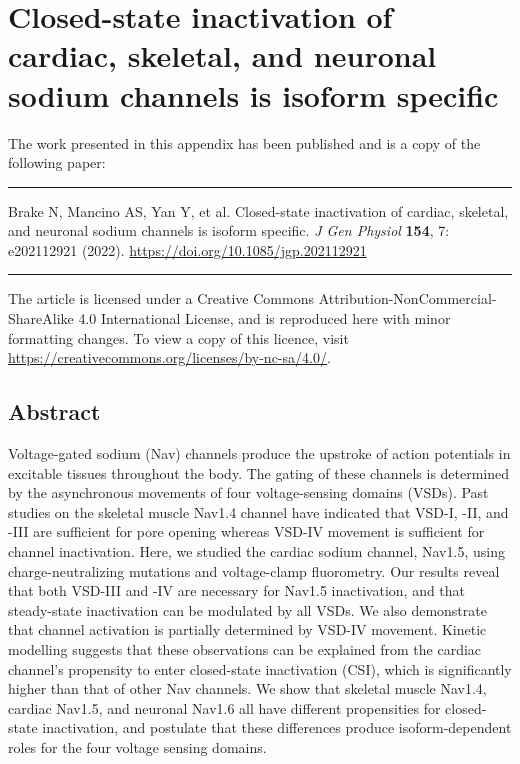 \chapter{Closed-state inactivation of cardiac, skeletal, and neuronal sodium channels is isoform specific}
\label{sec:Nav}


\hypersetup{citecolor=black,linkcolor=black}

\normalsize
\renewcommand{\thefigure}{A.\arabic{figure}}
\renewcommand{\figurename}{Fig.}
\setcounter{figure}{0}
\captionsetup{list=false}

The work presented in this appendix has been published and is a copy of the following paper:

\vspace{1em}
\hrule
\vspace{.5em}
\noindent
\hangindent=1cm
Brake N, Mancino AS, Yan Y, et al. Closed-state inactivation of cardiac, skeletal, and neuronal sodium channels is isoform specific. \textit{J Gen Physiol} \textbf{154}, 7: e202112921 (2022). \url{https://doi.org/10.1085/jgp.202112921}
\vspace{.75em}
\hrule
\vspace{.65em}

\noindent
The article is licensed under a Creative Commons Attribution-NonCommercial-ShareAlike 4.0 International License, and is reproduced here with minor formatting changes. To view a copy of this licence, visit \url{https://creativecommons.org/licenses/by-nc-sa/4.0/}.


\section{Abstract}
Voltage-gated sodium (Nav) channels produce the upstroke of action potentials in excitable tissues throughout the body. The gating of these channels is determined by the asynchronous movements of four voltage-sensing domains (VSDs). Past studies on the skeletal muscle Nav1.4 channel have indicated that VSD-I, -II, and -III are sufficient for pore opening whereas VSD-IV movement is sufficient for channel inactivation. Here, we studied the cardiac sodium channel, Nav1.5, using charge-neutralizing mutations and voltage-clamp fluorometry. Our results reveal that both VSD-III and -IV are necessary for Nav1.5 inactivation, and that steady-state inactivation can be modulated by all VSDs. We also demonstrate that channel activation is partially determined by VSD-IV movement. Kinetic modelling suggests that these observations can be explained from the cardiac channel’s propensity to enter closed-state inactivation (CSI), which is significantly higher than that of other Nav channels. We show that skeletal muscle Nav1.4, cardiac Nav1.5, and neuronal Nav1.6 all have different propensities for closed-state inactivation, and postulate that these differences produce isoform-dependent roles for the four voltage sensing domains.

